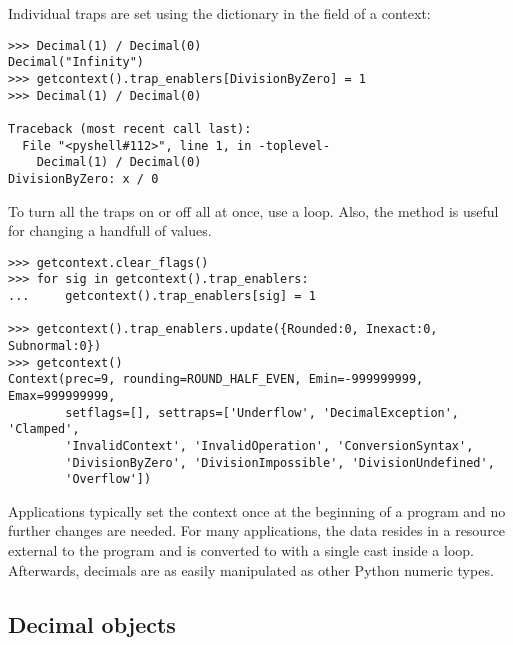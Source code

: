 Individual traps are set using the dictionary in the 
field of a context:

\begin{verbatim}
>>> Decimal(1) / Decimal(0)
Decimal("Infinity")
>>> getcontext().trap_enablers[DivisionByZero] = 1
>>> Decimal(1) / Decimal(0)

Traceback (most recent call last):
  File "<pyshell#112>", line 1, in -toplevel-
    Decimal(1) / Decimal(0)
DivisionByZero: x / 0
\end{verbatim}

To turn all the traps on or off all at once, use a loop.  Also, the
 method is useful for changing a handfull of values.

\begin{verbatim}
>>> getcontext.clear_flags()
>>> for sig in getcontext().trap_enablers:
...     getcontext().trap_enablers[sig] = 1

>>> getcontext().trap_enablers.update({Rounded:0, Inexact:0, Subnormal:0})
>>> getcontext()
Context(prec=9, rounding=ROUND_HALF_EVEN, Emin=-999999999, Emax=999999999,
        setflags=[], settraps=['Underflow', 'DecimalException', 'Clamped',
        'InvalidContext', 'InvalidOperation', 'ConversionSyntax',
        'DivisionByZero', 'DivisionImpossible', 'DivisionUndefined',
        'Overflow'])
\end{verbatim}

Applications typically set the context once at the beginning of a program
and no further changes are needed.  For many applications, the data resides
in a resource external to the program and is converted to  with
a single cast inside a loop.  Afterwards, decimals are as easily manipulated
as other Python numeric types.



\subsection{Decimal objects \label{decimal-decimal}}

